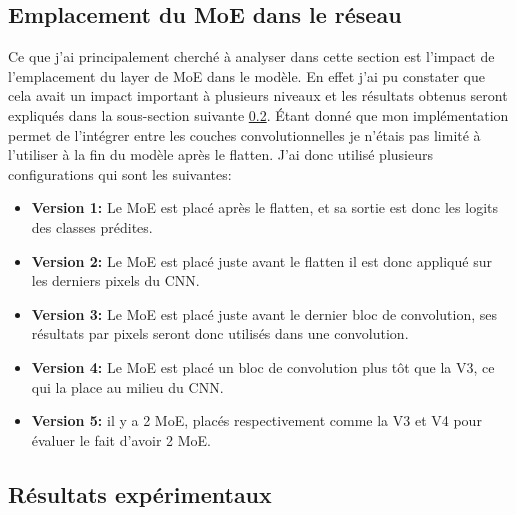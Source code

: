 \documentclass{article}
\begin{document}
\subsection{Emplacement du MoE dans le réseau}

Ce que j'ai principalement cherché à analyser dans cette section est l'impact de l'emplacement du layer de MoE dans le modèle. En effet j'ai pu constater que cela avait un impact important à plusieurs niveaux et les résultats obtenus seront expliqués dans la sous-section suivante \ref{subsec:moe2_results}. Étant donné que mon implémentation permet de l'intégrer entre les couches convolutionnelles je n'étais pas limité à l'utiliser à la fin du modèle après le flatten. J'ai donc utilisé plusieurs configurations qui sont les suivantes:
\begin{itemize}
  \item \textbf{Version 1:} Le MoE est placé après le flatten, et sa sortie est donc les logits des classes prédites.
  \item \textbf{Version 2:} Le MoE est placé juste avant le flatten il est donc appliqué sur les derniers pixels du CNN.
  \item \textbf{Version 3:} Le MoE est placé juste avant le dernier bloc de convolution, ses résultats par pixels seront donc utilisés dans une convolution.
  \item \textbf{Version 4:} Le MoE est placé un bloc de convolution plus tôt que la V3, ce qui la place au milieu du CNN.
  \item \textbf{Version 5:} il y a 2 MoE, placés respectivement comme la V3 et V4 pour évaluer le fait d'avoir 2 MoE.
\end{itemize}

\subsection{Résultats expérimentaux}
\label{subsec:moe2_results}
\end{document}
